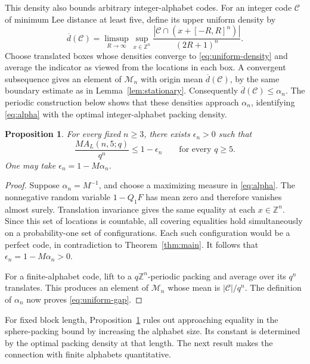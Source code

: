 \documentclass[12pt,letterpaper,onecolumn]{article}
\newtheorem{proposition}[theorem]{Proposition}
\theoremstyle{definition}
\newcommand{\Z}{\mathbb{Z}}
\newcommand{\C}{\mathcal{C}}
\newcommand{\card}[1]{\lvert #1\rvert}
\begin{document}
This density also bounds arbitrary integer-alphabet codes. For an integer code $\C$ of minimum Lee distance at least five, define its upper uniform density by
\begin{equation}\label{eq:uniform-density}
 \overline d(\C)=\limsup_{R\to\infty}\sup_{x\in\Z^n}
 \frac{|\C\cap(x+[-R,R]^n)|}{(2R+1)^n}.
\end{equation}
Choose translated boxes whose densities converge to \eqref{eq:uniform-density} and average the indicator as viewed from the locations in each box. A convergent subsequence gives an element of $\mathcal M_n$ with origin mean $\overline d(\C)$, by the same boundary estimate as in Lemma~\ref{lem:stationary}. Consequently $\overline d(\C)\le\alpha_n$. The periodic construction below shows that these densities approach $\alpha_n$, identifying \eqref{eq:alpha} with the optimal integer-alphabet packing density.

\begin{proposition}\label{prop:uniform-gap}
For every fixed $n\ge3$, there exists $\epsilon_n>0$ such that
\begin{equation}\label{eq:uniform-gap}
 \frac{M A_L(n,5;q)}{q^n}\le1-\epsilon_n
 \qquad\text{for every }q\ge5.
\end{equation}
One may take $\epsilon_n=1-M\alpha_n$.
\end{proposition}
\begin{proof}
Suppose $\alpha_n=M^{-1}$, and choose a maximizing measure in \eqref{eq:alpha}. The nonnegative random variable $1-Q_1F$ has mean zero and therefore vanishes almost surely. Translation invariance gives the same equality at each $x\in\Z^n$. Since this set of locations is countable, all covering equalities hold simultaneously on a probability-one set of configurations. Each such configuration would be a perfect code, in contradiction to Theorem~\ref{thm:main}. It follows that $\epsilon_n=1-M\alpha_n>0$.

For a finite-alphabet code, lift to a $q\Z^n$-periodic packing and average over its $q^n$ translates. This produces an element of $\mathcal M_n$ whose mean is $\card{\C}/q^n$. The definition of $\alpha_n$ now proves \eqref{eq:uniform-gap}.
\end{proof}

For fixed block length, Proposition~\ref{prop:uniform-gap} rules out approaching equality in the sphere-packing bound by increasing the alphabet size. Its constant is determined by the optimal packing density at that length. The next result makes the connection with finite alphabets quantitative.
\end{document}
